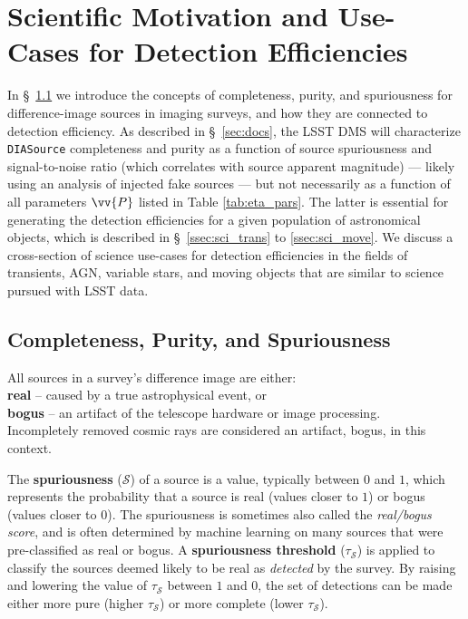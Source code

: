 \documentclass[DM,lsstdraft,toc]{lsstdoc}
\begin{document}
\section{Scientific Motivation and Use-Cases for Detection Efficiencies}\label{sec:sci}

In \S~\ref{ssec:sci_rb} we introduce the concepts of completeness, purity, and spuriousness for difference-image sources in imaging surveys, and how they are connected to detection efficiency. As described in \S~\ref{sec:docs}, the LSST DMS will characterize {\tt DIASource} completeness and purity as a function of source spuriousness and signal-to-noise ratio (which correlates with source apparent magnitude) --- likely using an analysis of injected fake sources --- but not necessarily as a function of all parameters $\vv{P}$ listed in Table \ref{tab:eta_pars}. The latter is essential for generating the detection efficiencies for a given population of astronomical objects, which is described in \S~\ref{ssec:sci_trans} to \ref{ssec:sci_move}. We discuss a cross-section of science use-cases for detection efficiencies in the fields of transients, AGN, variable stars, and moving objects that are similar to science pursued with LSST data. 

\subsection{Completeness, Purity, and Spuriousness}\label{ssec:sci_rb}

All sources in a survey's difference image are either: \\
\hspace*{10mm} {\bf real} -- caused by a true astrophysical event, or \\
\hspace*{10mm} {\bf bogus} -- an artifact of the telescope hardware or image processing. \\ 
Incompletely removed cosmic rays are considered an artifact, bogus, in this context. 

The {\bf spuriousness} ($\mathcal{S}$) of a source is a value, typically between $0$ and $1$, which represents the probability that a source is real (values closer to $1$) or bogus (values closer to $0$). The spuriousness is sometimes also called the {\it real/bogus score}, and is often determined by machine learning on many sources that were pre-classified as real or bogus. A {\bf spuriousness threshold} ($\tau_{\mathcal{S}}$) is applied to classify the sources deemed likely to be real as {\it detected} by the survey. By raising and lowering the value of $\tau_{\mathcal{S}}$ between $1$ and $0$, the set of detections can be made either more pure (higher $\tau_{\mathcal{S}}$) or more complete (lower $\tau_{\mathcal{S}}$). 
\end{document}
